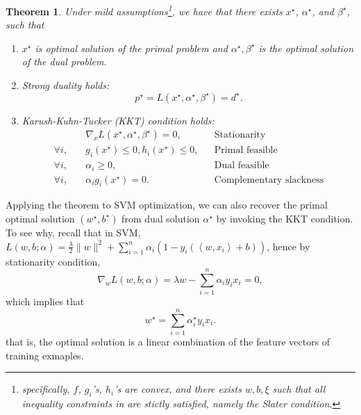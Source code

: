 \documentclass{article}
\newtheorem{theorem}{Theorem}
\newcommand{\inner}[2]{\left\langle #1,#2 \right\rangle}
\begin{document}
\begin{theorem}
  Under mild assumptions\footnote{specifically, $f$, $g_i$'s, $h_i$'s are convex, and there exists $w,b,\xi$ such that all inequality constraints in are stictly satisfied, namely the Slater condition.}, we have that there exists $x^\star$, $\alpha^\star$, and $\beta^\star$, such that
  \begin{enumerate}
  \item $x^\star$ is optimal solution of the primal problem and $\alpha^\star, \beta^\star$ is the optimal solution of the dual problem.
  \item Strong duality holds:
  \[ p^\star = L(x^\star, \alpha^\star, \beta^\star) = d^\star. \]
  \item Karush-Kuhn-Tucker (KKT) condition holds:
  \begin{align*}
    &\nabla_x L(x^\star,\alpha^\star,\beta^\star) = 0, && \text{Stationarity}\\
    \forall i, \quad &g_i(x^\star) \leq 0, h_i(x^\star) \leq 0, && \text{Primal feasible} \\
    \forall i, \quad &\alpha_i \geq 0, && \text{Dual feasible} \\
    \forall i, \quad &\alpha_i g_i(x^\star) = 0. && \text{Complementary slackness}
  \end{align*}
\end{enumerate}
\end{theorem}

Applying the theorem to SVM optimization, we can also recover the primal optimal solution $(w^\star, b^\star)$ from dual solution $\alpha^\star$ by invoking the KKT condition. To see why, recall that in SVM, $L(w,b;\alpha) = \frac \lambda 2 \| w \|^2 + \sum_{i=1}^n \alpha_i (1 - y_i(\inner{w}{x_i} + b))$, hence by stationarity condition,
\[ \nabla_w L(w,b;\alpha) = \lambda w - \sum_{i=1}^n \alpha_i y_i x_i = 0, \]
which implies that
\[ w^\star = \sum_{i=1}^n \alpha_i^\star y_i x_i. \]
that is, the optimal solution is a linear combination of the feature vectors of training exmaples.
\end{document}
